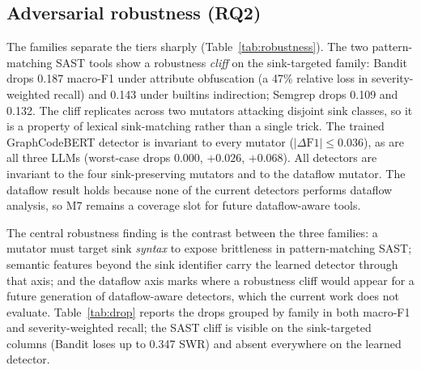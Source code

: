 \documentclass[conference]{IEEEtran}
\begin{document}
\subsection{Adversarial robustness (RQ2)}
The families separate the tiers sharply (Table~\ref{tab:robustness}). The
two pattern-matching SAST tools show a robustness \emph{cliff} on the
sink-targeted family: Bandit drops 0.187 macro-F1 under attribute
obfuscation (a 47\% relative loss in severity-weighted recall) and 0.143
under builtins indirection; Semgrep drops 0.109 and 0.132. The cliff
replicates across two mutators attacking disjoint sink classes, so it is
a property of lexical sink-matching rather than a single trick. The
trained GraphCodeBERT detector is invariant to every mutator
($|\Delta\textrm{F1}|\le0.036$), as are all three LLMs (worst-case drops
$0.000$, $+0.026$, $+0.068$). All detectors are invariant to the four
sink-preserving mutators and to the dataflow mutator. The dataflow
result holds because none of the current detectors performs dataflow
analysis, so M7 remains a coverage slot for future dataflow-aware tools.

\begin{table}[t]
\caption{Macro-F1 by variant over the 67 positives. DC/SS/VR/WE:
sink-preserving; SAO/SVG: sink-targeted; TTD: dataflow; Comp: composed.}
\label{tab:robustness}
\centering
\setlength{\tabcolsep}{3.0pt}
\end{table}

The central robustness finding is the contrast between the three
families: a mutator must target sink \emph{syntax} to expose brittleness
in pattern-matching SAST; semantic features beyond the sink identifier
carry the learned detector through that axis; and the dataflow axis marks
where a robustness cliff would appear for a future generation of
dataflow-aware detectors, which the current work does not evaluate. Table~\ref{tab:drop} reports the drops grouped by family in
both macro-F1 and severity-weighted recall; the SAST cliff is visible on
the sink-targeted columns (Bandit loses up to 0.347 SWR) and absent
everywhere on the learned detector.
\end{document}
